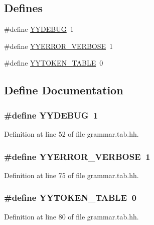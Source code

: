 \subsection*{Defines}
\begin{DoxyCompactItemize}
\item 
\#define \hyperlink{grammar_8tab_8hh_a853b3bfad6d2b2ff693dce81182e0c2e}{YYDEBUG}~1
\item 
\#define \hyperlink{grammar_8tab_8hh_a0943f558a560b9b5fa0593d7e36496c1}{YYERROR\_\-VERBOSE}~1
\item 
\#define \hyperlink{grammar_8tab_8hh_a3499e31aa832edc82b632ae811286a4b}{YYTOKEN\_\-TABLE}~0
\end{DoxyCompactItemize}


\subsection{Define Documentation}
\hypertarget{grammar_8tab_8hh_a853b3bfad6d2b2ff693dce81182e0c2e}{
\subsubsection[{YYDEBUG}]{\setlength{\rightskip}{0pt plus 5cm}\#define YYDEBUG~1}}
\label{grammar_8tab_8hh_a853b3bfad6d2b2ff693dce81182e0c2e}


Definition at line 52 of file grammar.tab.hh.

\hypertarget{grammar_8tab_8hh_a0943f558a560b9b5fa0593d7e36496c1}{
\subsubsection[{YYERROR\_\-VERBOSE}]{\setlength{\rightskip}{0pt plus 5cm}\#define YYERROR\_\-VERBOSE~1}}
\label{grammar_8tab_8hh_a0943f558a560b9b5fa0593d7e36496c1}


Definition at line 75 of file grammar.tab.hh.

\hypertarget{grammar_8tab_8hh_a3499e31aa832edc82b632ae811286a4b}{
\subsubsection[{YYTOKEN\_\-TABLE}]{\setlength{\rightskip}{0pt plus 5cm}\#define YYTOKEN\_\-TABLE~0}}
\label{grammar_8tab_8hh_a3499e31aa832edc82b632ae811286a4b}


Definition at line 80 of file grammar.tab.hh.

